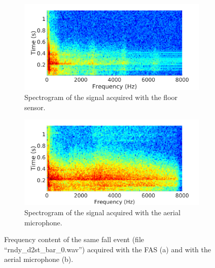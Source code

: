 \begin{figure}[t]
	\centering
	\begin{subfigure}[b]{0.9\textwidth}
		\includegraphics[width=\textwidth]{img/spettro_fas}
		\caption{Spectrogram of the signal acquired with the floor sensor.}
		\label{fig:spec_fas}
	\end{subfigure}
	\begin{subfigure}[b]{0.9\textwidth}
		\includegraphics[width=\textwidth]{img/spettro_mic}
		\caption{Spectrogram of the signal acquired with the aerial microphone.}
		\label{fig:spec_aer}
	\end{subfigure}
	
	\caption{Frequency content of the same fall event (file ``rndy\_d2st\_bar\_0.wav'') acquired with the FAS (a) and with the aerial microphone (b).}\label{fig:spectrograms}
\end{figure}

